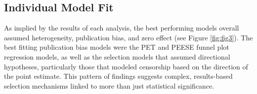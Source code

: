 \documentclass[man,floatsintext,letterpaper,12pt]{apa7}
\begin{document}
\clearpage

\subsection{Individual Model Fit}

As implied by the results of each analysis, the best performing models overall assumed heterogeneity, publication bias, and zero effect (see Figure \ref{fig:fig3}). The best fitting publication bias models were the PET and PEESE funnel plot regression models, as well as the selection models that assumed directional hypotheses, particularly those that modeled censorship based on the direction of the point estimate. This pattern of findings suggests complex, results-based selection mechanisms linked to more than just statistical significance.

\clearpage
\end{document}
